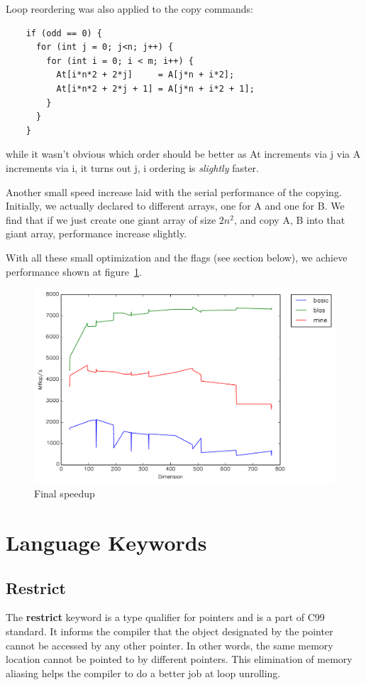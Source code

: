 \documentclass{article}
\begin{document}
    Loop reordering was also applied to the copy commands:
    \begin{lstlisting}
    if (odd == 0) {
      for (int j = 0; j<n; j++) {
        for (int i = 0; i < m; i++) {
          At[i*n*2 + 2*j]     = A[j*n + i*2];
          At[i*n*2 + 2*j + 1] = A[j*n + i*2 + 1];
        }
      }
    }
    \end{lstlisting}

    while it wasn't obvious which order should be better as At increments via j via A increments via i, it turns out j, i ordering is \emph{slightly} faster.

    Another small speed increase laid with the serial performance of the copying. Initially, we actually declared to different arrays, one for A and one for B.
    We find that if we just create one giant array of size $2n^2$, and copy A, B into that giant array, performance increase slightly.

    With all these small optimization and the flags (see section below), we achieve performance shown at figure~\ref{fig:final}.

    \begin{figure}[h]
      \centering
      \includegraphics[width=.7\textwidth]{final.pdf}
      \caption{Final speedup}
      \label{fig:final}
    \end{figure}

    \section{Language Keywords}
\subsection{Restrict}

The {\bf restrict} keyword is a type qualifier for pointers and is a part of C99 standard. It informs the compiler that the object designated by the pointer cannot be accessed by any other pointer. In other words, the same memory location cannot be pointed to by different pointers. This elimination of memory aliasing helps the compiler to do a better job at loop unrolling.
\end{document}
